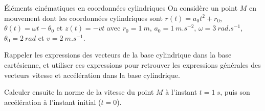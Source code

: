 \begin{exo}[PCSI]{Éléments cinématiques en coordonnées cylindriques}
On considère un point $M$ en mouvement dont les coordonnées cylindriques sont $r(t)=a_{0}t^2+r_0$, $\theta(t)=\omega t-\theta_0$ et $z(t)=-vt$ avec $r_0=\SI{1}{m}$, $a_0=\SI{1}{m.s^{-2}}$, $\omega=\SI{3}{rad.s^{-1}}$, $\theta_0=\SI{2}{rad}$ et $v=\SI{2}{m.s^{-1}}$.
\begin{quest}
\item Rappeler les expressions des vecteurs de la base cylindrique dans la base cartésienne, et utiliser ces expressions pour retrouver les expressions générales des vecteurs vitesse et accélération dans la base cylindrique.
\item Calculer ensuite la norme de la vitesse du point $M$ à l'instant $t=\SI{1}{s}$, puis son accélération à l'instant initial ($t=0$).
\end{quest}
\end{exo}

